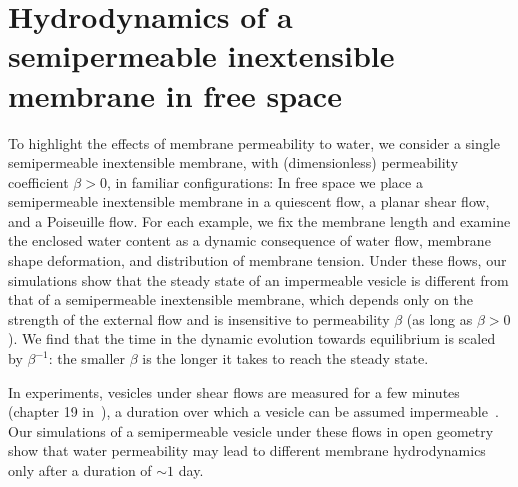 \documentclass[prb,preprint,showpacs,preprintnumbers,amsmath,amssymb,longbibliography]{revtex4-1}
\begin{document}
\section{Hydrodynamics of a semipermeable inextensible membrane in free space\label{sec:free_space}}
To highlight the effects of membrane permeability to water, we consider
a single semipermeable inextensible membrane, with (dimensionless) permeability
coefficient $\beta>0$, in familiar configurations: In free space we
place a semipermeable inextensible membrane in a quiescent flow, a planar shear flow,
and a Poiseuille flow. For each example, we fix the membrane length and
examine the enclosed water content as a dynamic consequence of water
flow, membrane shape deformation, and distribution of membrane tension.
%
Under these flows, our simulations show that the steady state of an
impermeable vesicle is different from that of a semipermeable inextensible membrane,
which depends only on the strength of the external flow and is
insensitive to permeability $\beta$ (as long as $\beta>0$). We find that
the time in the dynamic evolution towards equilibrium is scaled by
$\beta^{-1}$: the smaller $\beta$ is the longer it takes to reach the
steady state.

In experiments, vesicles under shear flows are measured for a few
minutes (chapter 19 in~\citet{Dimova2020_GVB}), a duration over which a
vesicle can be assumed impermeable~\cite{AbkarianViallat2005_BJ}. Our
simulations of a semipermeable vesicle under these flows in open
geometry show that water permeability may lead to different membrane
hydrodynamics only after a duration of $\sim 1$ day. 



\end{document}
